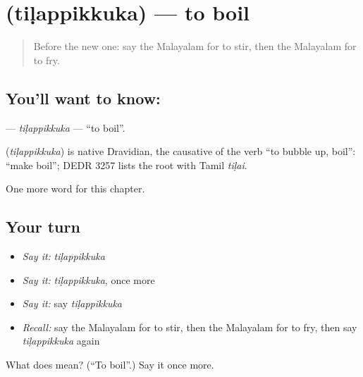 \section[\texorpdfstring{\ml{തിളപ്പിക്കുക} (tiḷappikkuka)}{തിളപ്പിക്കുക (tiḷappikkuka)}]{ (tiḷappikkuka) — to boil}

\label{lesson:ML-C182-tilappikkuka}



\begin{quote}
Before the new one: say the Malayalam for to stir, then the Malayalam for to fry.
\end{quote}

\subsection*{You'll want to know: }
\textbf{} — \emph{tiḷappikkuka} — \textquotedblleft{}to boil\textquotedblright{}.

\begin{cousinweb}
\textbf{} (\emph{tiḷappikkuka}) is native Dravidian, the causative of the verb \textquotedblleft{}to bubble up, boil\textquotedblright{}: \textquotedblleft{}make boil\textquotedblright{}; DEDR 3257 lists the root with Tamil \emph{tiḷai}.
\end{cousinweb}

\begin{grammarlens}[title={What you've built}]
One more word for this chapter.
\end{grammarlens}

\subsection*{Your turn}
\begin{itemize}
\raggedright
  \item \emph{Say it:} \emph{tiḷappikkuka}
  \item \emph{Say it:} \emph{tiḷappikkuka}, once more
  \item \emph{Say it:} say \emph{tiḷappikkuka}
  \item \emph{Recall:} say the Malayalam for to stir, then the Malayalam for to fry, then say \emph{tiḷappikkuka} again
\end{itemize}

\begin{tcolorbox}[breakable,colback=teal!4,colframe=teal!35!black,title={Before you move on}]
What does  mean? (\textquotedblleft{}To boil\textquotedblright{}.) Say it once more.
\end{tcolorbox}
